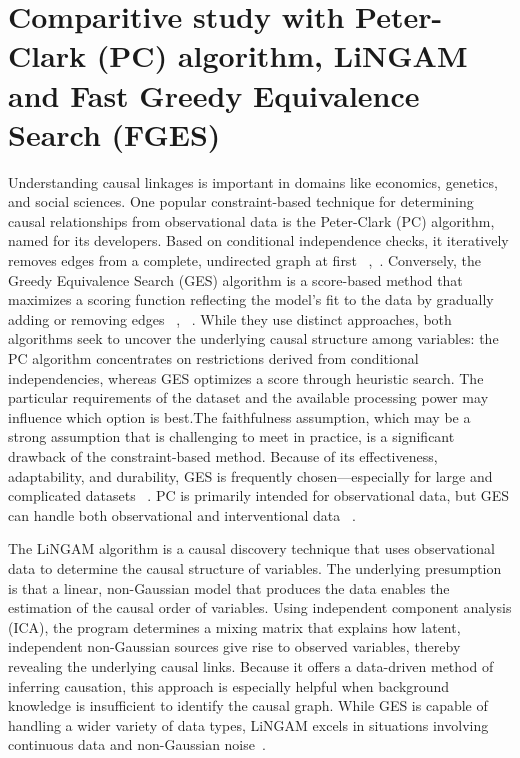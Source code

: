 \documentclass[runningheads]{llncs}
\begin{document}
\section{Comparitive study with Peter-Clark (PC) algorithm, LiNGAM and Fast Greedy Equivalence Search (FGES) }
Understanding causal linkages is important in domains like economics, genetics, and social sciences.
One popular constraint-based technique for determining causal relationships from observational data is the Peter-Clark (PC) algorithm, named for its developers. Based on conditional independence checks, it iteratively removes edges from a complete, undirected graph at first ~\cite{spirtes2001causation},~\cite{wang2018direct}. Conversely, the Greedy Equivalence Search (GES) algorithm is a score-based method that maximizes a scoring function reflecting the model's fit to the data by gradually adding or removing edges ~\cite{wang2018direct}, ~\cite{zhalama2017weakening}. While they use distinct approaches, both algorithms seek to uncover the underlying causal structure among variables: the PC algorithm concentrates on restrictions derived from conditional independencies, whereas GES optimizes a score through heuristic search. The particular requirements of the dataset and the available processing power may influence which option is best.The faithfulness assumption, which may be a strong assumption that is challenging to meet in practice, is a significant drawback of the constraint-based method.
Because of its effectiveness, adaptability, and durability, GES is frequently chosen—especially for large and complicated datasets ~\cite{zhalama2017weakening}.
PC is primarily intended for observational data, but GES can handle both observational and interventional data ~\cite{wang2018direct}.

The LiNGAM algorithm is a causal discovery technique that uses observational data to determine the causal structure of variables. The underlying presumption is that a linear, non-Gaussian model that produces the data enables the estimation of the causal order of variables. Using independent component analysis (ICA), the program determines a mixing matrix that explains how latent, independent non-Gaussian sources give rise to observed variables, thereby revealing the underlying causal links. Because it offers a data-driven method of inferring causation, this approach is especially helpful when background knowledge is insufficient to identify the causal graph. 
While GES is capable of handling a wider variety of data types, LiNGAM excels in situations involving continuous data and non-Gaussian noise~\cite{yamayoshi2020estimation}.
\end{document}

